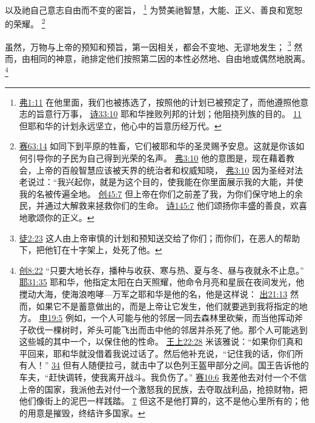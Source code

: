 \documentclass[12pt, a4paper, oneside]{ctexart}
\newcounter{parnum}[section]
\newcommand{\N}{%
   \noindent\refstepcounter{parnum}%
    \makebox[\parindent][l]{\textbf{\arabic{parnum}.}}}
\begin{document}
	以及祂自己意志自由而不变的密旨，
	\footnote {
		\href{https://biblehub.com/ephesians/1-11.htm}{弗1:11} 在他里面，我们也被拣选了，按照他的计划已被预定了，而他遵照他意志的旨意行万事，
		\href{https://biblehub.com/psalms/33-10.htm}{诗33:10} 耶和华挫败列邦的计划；他阻挠列族的目的。
		\href{https://biblehub.com/psalms/33-11.htm}{11} 但耶和华的计划永远坚立，他心中的旨意历经万代。
	}
	为赞美祂智慧，大能、正义、善良和宽恕的荣耀。
	\footnote {
		\href{https://biblehub.com/isaiah/63-14.htm}{赛63:14} 如同下到平原的牲畜，它们被耶和华的圣灵赐予安息。这就是你该如何引导你的子民为自己得到光荣的名声。
		\href{https://biblehub.com/ephesians/3-10.htm}{弗3:10} 他的意图是，现在藉着教会，上帝的百般智慧应该被天界的统治者和权威知晓，
		\href{https://biblehub.com/romans/9-17.htm}{弗3:10} 因为圣经对法老说过：“我兴起你，就是为这个目的，使我能在你里面展示我的大能，并使我的名被传遍全地。
		\href{https://biblehub.com/genesis/45-7.htm}{创45:7} 但上帝在你们之前差了我，为你们保守地上的余民，并通过大解救来拯救你们的生命。
		\href{https://biblehub.com/psalms/145-7.htm}{诗145:7} 他们颂扬你丰盛的善良，欢喜地歌颂你的正义。
	}

\N 虽然，万物与上帝的预知和预旨，第一因相关，都会不变地、无谬地发生；
	\footnote {
		\href{https://biblehub.com/acts/2-23.htm}{徒2:23} 这人由上帝审慎的计划和预知送交给了你们；而你们，在恶人的帮助下，把他钉在十字架上，处死了他。
	}
	然而，由相同的神意，祂排定他们按照第二因的本性必然地、自由地或偶然地脱离。
	\footnote {
		\href{https://biblehub.com/genesis/8-22.htm}{创8:22} “只要大地长存，播种与收获、寒与热、夏与冬、昼与夜就永不止息。”
		\href{https://biblehub.com/jeremiah/31-35.htm}{耶31:35} 耶和华，他指定太阳在白天照耀，他命令月亮和星辰在夜间发光，他搅动大海，使海浪咆哮---万军之耶和华是他的名，他是这样说：
		\href{https://biblehub.com/exodus/21-13.htm}{出21:13} 然而，如果它不是蓄意做出的，而是上帝让它发生，他们就要逃到我将指定的地方。
		\href{https://biblehub.com/deuteronomy/19-5.htm}{申19:5} 例如，一个人可能与他的邻居一同去森林里砍柴，而当他挥动斧子砍伐一棵树时，斧头可能飞出而击中他的邻居并杀死了他。那个人可能逃到这些城的其中一个，以保住他的性命。
		\href{https://biblehub.com/1_kings/22-28.htm}{王上22:28} 米该雅说：“如果你们真和平回来，耶和华就没借着我说过话了。然后他补充说，“记住我的话，你们所有人！”
		\href{https://biblehub.com/1_kings/22-34.htm}{34} 但有人随便拉弓，就击中了以色列王盔甲部分之间。国王告诉他的车夫，“赶快调转，使我离开战斗。我负伤了。”
		\href{https://biblehub.com/isaiah/10-6.htm}{赛10:6} 我差他去对付一个不信上帝的国家，我派他去对付一个激怒我的民族，去夺取战利品，抢掠财物，把他们像街上的泥巴一样践踏。
		\href{https://biblehub.com/isaiah/10-7.htm}{7} 但这不是他打算的，这不是他心里所有的；他的用意是摧毁，终结许多国家。
	}
\end{document}
